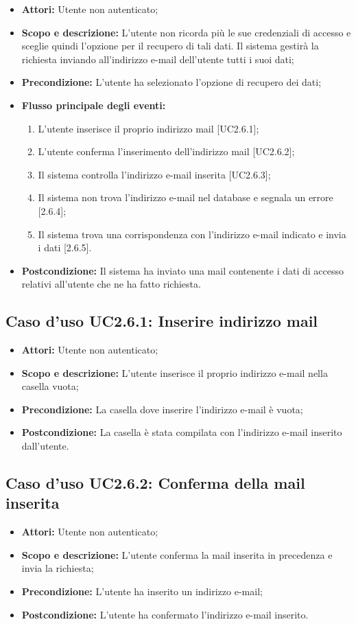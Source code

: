 \begin{itemize}
	\item \textbf{Attori:} Utente non autenticato;
	\item \textbf{Scopo e descrizione:} L'utente non ricorda più le sue credenziali di accesso e sceglie quindi l'opzione per il recupero di tali dati. Il sistema gestirà la richiesta inviando all'indirizzo e-mail dell'utente tutti i suoi dati;
	\item \textbf{Precondizione:} L'utente ha selezionato l'opzione di recupero dei dati;
	\item \textbf{Flusso principale degli eventi:}
	\begin{enumerate}
		\item L'utente inserisce il proprio indirizzo mail [UC2.6.1];
		\item L'utente conferma l'inserimento dell'indirizzo mail [UC2.6.2];
		\item Il sistema controlla l'indirizzo e-mail inserita [UC2.6.3];
		\item Il sistema non trova l'indirizzo e-mail nel database e segnala un errore [2.6.4];
		\item Il sistema trova una corrispondenza con l'indirizzo e-mail indicato e invia i dati [2.6.5].
	\end{enumerate}
	\item \textbf{Postcondizione:} Il sistema ha inviato una mail contenente i dati di accesso relativi all'utente che ne ha fatto richiesta.
\end{itemize}

\subsection{Caso d'uso UC2.6.1: Inserire indirizzo mail}
\begin{itemize}
	\item \textbf{Attori:} Utente non autenticato;
	\item \textbf{Scopo e descrizione:} L'utente inserisce il proprio indirizzo e-mail nella casella vuota;
	\item \textbf{Precondizione:} La casella dove inserire l'indirizzo e-mail è vuota;
	\item \textbf{Postcondizione:} La casella è stata compilata con l'indirizzo e-mail inserito dall'utente.
\end{itemize}

\subsection{Caso d'uso UC2.6.2: Conferma della mail inserita}
\begin{itemize}
	\item \textbf{Attori:} Utente non autenticato;
	\item \textbf{Scopo e descrizione:} L'utente conferma la mail inserita in precedenza e invia la richiesta;
	\item \textbf{Precondizione:} L'utente ha inserito un indirizzo e-mail;
	\item \textbf{Postcondizione:} L'utente ha confermato l'indirizzo e-mail inserito.
\end{itemize}

